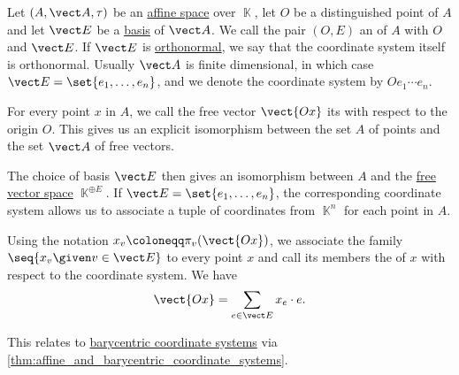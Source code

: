 \begin{definition}\label{def:affine_coordinate_system}
  Let \( (A, \vect A, \tau) \) be an \hyperref[def:affine_space]{affine space} over \( \BbbK \), let \( O \) be a distinguished point of \( A \) and let \( \vect E \) be a \hyperref[def:hamel_basis]{basis} of \( \vect A \). We call the pair \( (O, E) \) an  of \( A \) with  \( O \) and  \( \vect E \). If \( \vect E \) is \hyperref[def:orthogonality]{orthonormal}, we say that the coordinate system itself is orthonormal. Usually \( \vect A \) is finite dimensional, in which case \( \vect E = \set{ e_1, \ldots, e_n } \), and we denote the coordinate system by \( O e_1 \cdots e_n \).

  For every point \( x \) in \( A \), we call the free vector \( \vect{Ox} \) its  with respect to the origin \( O \). This gives us an explicit isomorphism between the set \( A \) of points and the set \( \vect A \) of free vectors.

  The choice of basis \( \vect E \) then gives an isomorphism between \( A \) and the \hyperref[def:free_semimodule]{free vector space} \( \BbbK^{\oplus E} \). If \( \vect E = \set{ e_1, \ldots, e_n } \), the corresponding coordinate system allows us to associate a tuple of coordinates from \( \BbbK^n \) for each point in \( A \).

  Using the notation \( x_v \coloneqq \pi_v(\vect{Ox}) \), we associate the family \( \seq{ x_v \given v \in \vect E } \) to every point \( x \) and call its members the  of \( x \) with respect to the coordinate system. We have
  \begin{equation}\label{eq:def:affine_coordinate_system/coordinates}
    \vect{Ox} = \sum_{e \in \vect E} x_e \cdot e.
  \end{equation}

  This relates to \hyperref[def:barycentric_coordinate_system]{barycentric coordinate systems} via \cref{thm:affine_and_barycentric_coordinate_systems}.
\end{definition}

